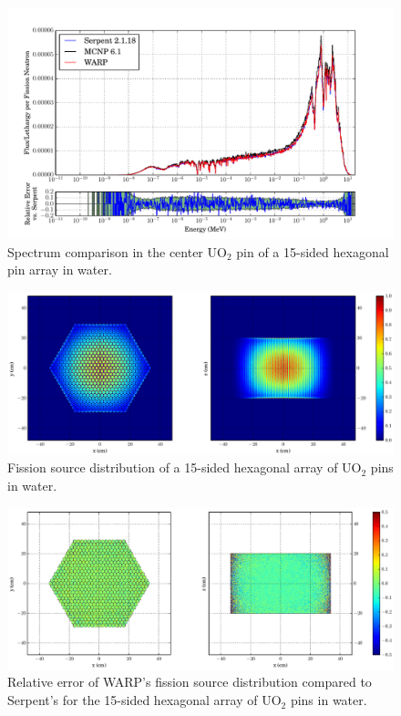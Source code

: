 \begin{figure}[h!] 
\centering
\includegraphics[width=\textwidth,trim= 1cm 0cm 1cm 0cm]{graphics/finalresults/assembly_spec-6.pdf}
\caption{Spectrum comparison in the center UO$_2$ pin of a 15-sided hexagonal pin array in water. \label{assembly_spec} }
\end{figure}

\begin{figure}[h!]
\centering
\includegraphics[width=\textwidth,trim= 4cm 0cm 6cm 0cm]{graphics/finalresults/assembly_fiss-6.eps}
\caption{Fission source distribution of a 15-sided hexagonal array of UO$_2$ pins in water. \label{assembly_fiss} }
\end{figure}

\begin{figure}[h!]
\centering
\includegraphics[width=\textwidth,trim= 4cm 0cm 6cm 0cm]{graphics/finalresults/assembly_fiss_diff-6.eps}
\caption{Relative error of WARP's fission source distribution compared to Serpent's for the 15-sided hexagonal array of UO$_2$ pins in water. \label{assembly_fiss_diff} }
\end{figure}
	
